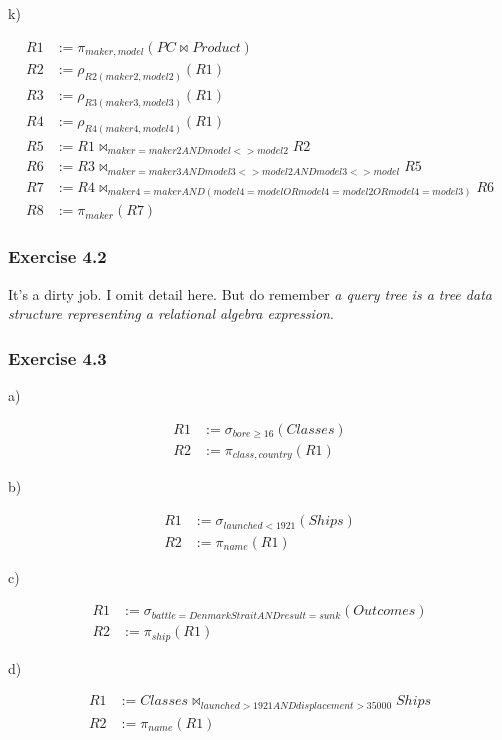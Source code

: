 \documentclass[../../main.tex]{subfiles}
\begin{document}
k)

\begin{align*}
  R1 &:= \pi_{maker, model}(PC \bowtie Product) \\
  R2 &:= \rho_{R2(maker2, model2)}(R1) \\
  R3 &:= \rho_{R3(maker3, model3)}(R1) \\
  R4 &:= \rho_{R4(maker4, model4)}(R1) \\
  R5 &:= R1 \bowtie_{maker=maker2 AND model <> model2} R2 \\
  R6 &:= R3 \bowtie_{maker=maker3 AND model3 <> model2
         AND model3 <> model}R5 \\
  R7 &:= R4 \bowtie_{maker4=maker AND (model4 = model OR
         model4 = model2 OR model4 = model3)} R6 \\
  R8 &:= \pi_{maker}(R7)
\end{align*}

\subsubsection*{Exercise 4.2}

It's a dirty job. I omit detail here. But do remember
\emph{a query tree is a tree data structure representing
a relational algebra expression}.

\subsubsection*{Exercise 4.3}

a)

\begin{align*}
  R1 &:= \sigma_{bore \geq 16}(Classes) \\
  R2 &:= \pi_{class,country}(R1)
\end{align*}

b)

\begin{align*}
  R1 &:= \sigma_{launched < 1921}(Ships) \\
  R2 &:= \pi_{name}(R1)
\end{align*}

c)

\begin{align*}
  R1 &:= \sigma_{battle=DenmarkStrait AND result=sunk}
         (Outcomes) \\
  R2 &:= \pi_{ship}(R1)
\end{align*}

d)

\begin{align*}
  R1 &:= Classes \bowtie_{launched > 1921 AND
         displacement > 35000} Ships \\
  R2 &:= \pi_{name}(R1)
\end{align*}
\end{document}
